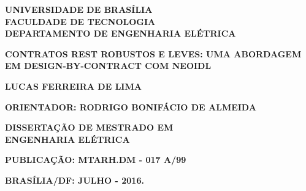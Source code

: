 
\thispagestyle{empty}
\setcounter{page}{1}
\begin{center}
{\normalsize {\bf UNIVERSIDADE DE BRAS\'{I}LIA\\
FACULDADE DE TECNOLOGIA\\
DEPARTAMENTO DE ENGENHARIA EL\'{E}TRICA }}

\vfill

{\large {\bf  CONTRATOS REST ROBUSTOS E LEVES: UMA ABORDAGEM EM
DESIGN-BY-CONTRACT COM NEOIDL }}


\vfill

{\large {\bf LUCAS FERREIRA DE LIMA}}

\vspace{20mm}

{\normalsize {\bf ORIENTADOR: RODRIGO BONIFÁCIO DE ALMEIDA }}

\vspace{20mm}

{\normalsize {\bf DISSERTAÇÃO DE MESTRADO EM\\
ENGENHARIA ELÉTRICA  }}

\vspace{10mm}

{\normalsize {\bf PUBLICAÇÃO: MTARH.DM - 017 A/99 }}


\vspace{10mm}

{\normalsize {\bf BRASÍLIA/DF: JULHO - 2016.    }  }
\end{center}

\pagebreak

\thispagestyle{empty}
\hspace{10mm}
\addtocounter{page}{-1}

\pagebreak

